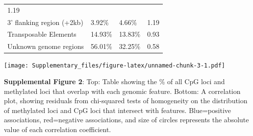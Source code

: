 \documentclass[
]{article}
\begin{document}
\begin{longtable}[]{@{}llll@{}}
\begin{minipage}[t]{0.22\columnwidth}
1.19\strut
\end{minipage}\tabularnewline
\begin{minipage}[t]{0.22\columnwidth}\raggedright
3' flanking region (+2kb)\strut
\end{minipage} & \begin{minipage}[t]{0.22\columnwidth}\raggedright
3.92\%\strut
\end{minipage} & \begin{minipage}[t]{0.22\columnwidth}\raggedright
4.66\%\strut
\end{minipage} & \begin{minipage}[t]{0.22\columnwidth}\raggedright
1.19\strut
\end{minipage}\tabularnewline
\begin{minipage}[t]{0.22\columnwidth}\raggedright
Transposable Elements\strut
\end{minipage} & \begin{minipage}[t]{0.22\columnwidth}\raggedright
14.93\%\strut
\end{minipage} & \begin{minipage}[t]{0.22\columnwidth}\raggedright
13.83\%\strut
\end{minipage} & \begin{minipage}[t]{0.22\columnwidth}\raggedright
0.93\strut
\end{minipage}\tabularnewline
\begin{minipage}[t]{0.22\columnwidth}\raggedright
Unknown genome regions\strut
\end{minipage} & \begin{minipage}[t]{0.22\columnwidth}\raggedright
56.01\%\strut
\end{minipage} & \begin{minipage}[t]{0.22\columnwidth}\raggedright
32.25\%\strut
\end{minipage} & \begin{minipage}[t]{0.22\columnwidth}\raggedright
0.58\strut
\end{minipage}\tabularnewline
\bottomrule
\end{longtable}

\texttt{[image: Supplementary\_files/figure-latex/unnamed-chunk-3-1.pdf]}

\textbf{Supplemental Figure 2}: Top: Table showing the \% of all CpG
loci and methylated loci that overlap with each genomic feature. Bottom:
A correlation plot, showing residuals from chi-squared tests of
homogeneity on the distribution of methylated loci and CpG loci that
intersect with features. Blue=positive associations, red=negative
associations, and size of circles represents the absolute value of each
correlation coefficient.
\end{document}
